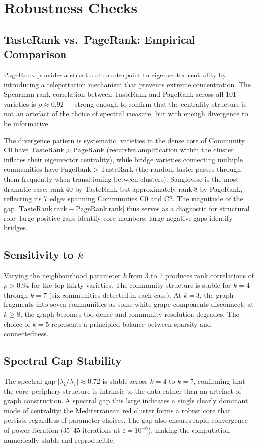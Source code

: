 \documentclass[11pt]{article}
\begin{document}
\section{Robustness Checks}

\subsection{TasteRank vs.\ PageRank: Empirical Comparison}
PageRank provides a structural counterpoint to eigenvector centrality by introducing a teleportation mechanism that prevents extreme concentration. The Spearman rank correlation between TasteRank and PageRank across all 101 varieties is $\rho \approx 0.92$ --- strong enough to confirm that the centrality structure is not an artefact of the choice of spectral measure, but with enough divergence to be informative.

The divergence pattern is systematic: varieties in the dense core of Community C0 have $\mathrm{TasteRank} > \mathrm{PageRank}$ (recursive amplification within the cluster inflates their eigenvector centrality), while bridge varieties connecting multiple communities have $\mathrm{PageRank} > \mathrm{TasteRank}$ (the random taster passes through them frequently when transitioning between clusters). Sangiovese is the most dramatic case: rank 40 by TasteRank but approximately rank 8 by PageRank, reflecting its 7 edges spanning Communities C0 and C2. The magnitude of the gap $|\mathrm{TasteRank\ rank} - \mathrm{PageRank\ rank}|$ thus serves as a diagnostic for structural role: large positive gaps identify core members; large negative gaps identify bridges.

\subsection{Sensitivity to $k$}
Varying the neighbourhood parameter $k$ from 3 to 7 produces rank correlations of $\rho > 0.94$ for the top thirty varieties. The community structure is stable for $k = 4$ through $k = 7$ (six communities detected in each case). At $k = 3$, the graph fragments into seven communities as some white-grape components disconnect; at $k \geq 8$, the graph becomes too dense and community resolution degrades. The choice of $k = 5$ represents a principled balance between sparsity and connectedness.

\subsection{Spectral Gap Stability}
The spectral gap $|\lambda_2 / \lambda_1| \approx 0.72$ is stable across $k = 4$ to $k = 7$, confirming that the core--periphery structure is intrinsic to the data rather than an artefact of graph construction. A spectral gap this large indicates a single clearly dominant mode of centrality: the Mediterranean red cluster forms a robust core that persists regardless of parameter choices. The gap also ensures rapid convergence of power iteration (35--45 iterations at $\varepsilon = 10^{-6}$), making the computation numerically stable and reproducible.
\end{document}
